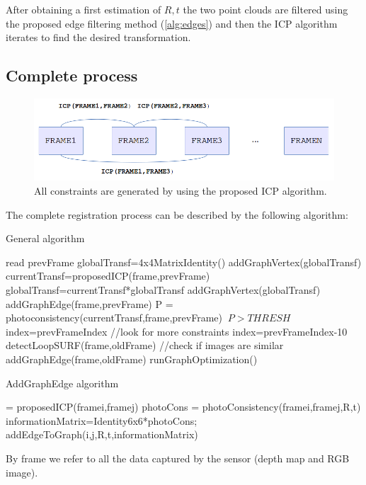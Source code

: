 After obtaining a first estimation of $R,t$ the two point clouds are filtered using the proposed edge 
filtering method (\ref{alg:edges}) and then the ICP algorithm iterates to find the desired transformation.


\subsection{Complete process}

\begin{figure}[!h]
\begin{center}
\includegraphics[scale=0.55]{images/graph_icp}
\caption{All constraints are generated by using the proposed ICP algorithm.}
\end{center}
\end{figure}


The complete registration process can be described by the following algorithm:

\begin{algorithm}[H]
\caption{General algorithm}
\begin{algorithmic}[1]
\State read prevFrame
\State globalTransf=4x4MatrixIdentity()
\State addGraphVertex(globalTransf)
\State currentTransf=proposedICP(frame,prevFrame)
\State globalTransf=currentTransf*globalTransf
\State addGraphVertex(globalTransf)
\State addGraphEdge(frame,prevFrame)
\State P = photoconsistency(currentTransf,frame,prevFrame)
\If $\ P > THRESH$
\State index=prevFrameIndex //look for more constraints
\Else
\State index=prevFrameIndex-10
\EndIf
{} 
\State detectLoopSURF(frame,oldFrame) //check if images are similar
\State addGraphEdge(frame,oldFrame)
\EndIf
\EndFor
\EndWhile
\State runGraphOptimization()
\end{algorithmic}
\end{algorithm}

\begin{algorithm}[H]
\caption{AddGraphEdge algorithm}
\begin{algorithmic}[1]
\State [R,t] = proposedICP(framei,framej)
\State photoCons = photoConsistency(framei,framej,R,t)
\State informationMatrix=Identity6x6*photoCons;
\State addEdgeToGraph(i,j,R,t,informationMatrix)
\end{algorithmic}
\end{algorithm}
By frame we refer to all the data captured by the sensor (depth map and RGB image).

